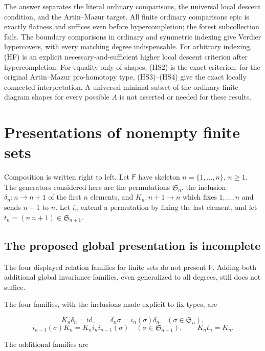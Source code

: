 \documentclass[11pt,a4paper]{article}
\theoremstyle{definition}
\begin{document}
The answer separates the literal ordinary comparisons, the universal
local descent condition, and the Artin--Mazur target. All finite
ordinary comparisons epic is exactly flatness and suffices even before
hypercompletion; the forest subcollection fails. The boundary
comparisons in ordinary and symmetric indexing give Verdier hypercovers,
with every matching degree indispensable. For arbitrary indexing,
(HF) is an explicit necessary-and-sufficient higher local descent
criterion after hypercompletion. For equality only of shapes, (HS2)
is the exact criterion; for the original Artin--Mazur pro-homotopy type,
(HS3)--(HS4) give the exact locally connected interpretation.
A universal minimal subset of
the ordinary finite diagram shapes for every possible \(A\) is not
asserted or needed for these results.

\section{Presentations of nonempty finite sets}\label{b.6.-presentations-of-the-category-of-nonempty-finite-sets}

Composition is written right to left. Let \(\mathsf F\) have skeleton
\(n=\{1,\ldots,n\}\), \(n\ge1\). The generators considered here
are the permutations \(\mathfrak S_n\), the inclusion
\(\delta_n:n\to n+1\) of the first \(n\) elements, and \(K_n:n+1\to n\)
which fixes \(1,\ldots,n\) and sends \(n+1\) to \(n\). Let \(i_n\)
extend a permutation by fixing the last element, and let
\(t_n=(n\ n+1)\in\mathfrak S_{n+1}\).

\subsection{The proposed global presentation is
incomplete}\label{b6.1.-the-proposed-global-presentation-is-incomplete}

The four displayed relation families for finite sets do not
present \(\mathsf F\). Adding both additional global invariance families, even generalized to all degrees, still does not suffice.

The four families, with the inclusions made explicit to fix types, are

\[K_n\delta_n=\mathrm{id},\qquad
\delta_n\sigma=i_n(\sigma)\delta_n\quad(\sigma\in\mathfrak S_n),\]
\[i_{n-1}(\sigma)K_n=K_n i_n i_{n-1}(\sigma)\quad(\sigma\in\mathfrak S_{n-1}),\qquad K_n t_n=K_n.\]

The additional families are
\end{document}
